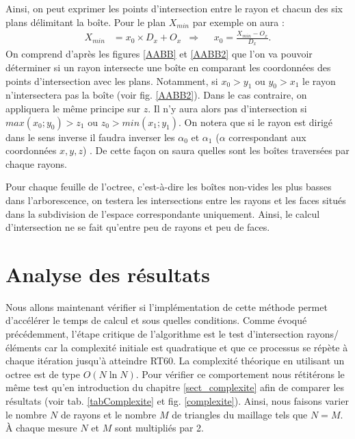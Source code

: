 %
Ainsi, on peut exprimer les points d'intersection entre le rayon et chacun des six plans délimitant la boîte. Pour le plan $X_{min}$ par exemple on aura :
%
\begin{align*}
X_{min} &= x_0 \times D_x + O_x 	& \Rightarrow 	& &	 x_0 = \frac{X_{min} - O_x}{D_x}.
\end{align*}
%
On comprend d'après les figures \ref{AABB} et \ref{AABB2} que l'on va pouvoir déterminer si un rayon intersecte une boîte en comparant les coordonnées des points d'intersection avec les plans. Notamment, si $x_0 > y_1$ ou $y_0 > x_1$ le rayon n'intersectera pas la boîte (voir fig. \ref{AABB2}). Dans le cas contraire, on appliquera le même principe sur $z$. Il n'y aura alors pas d'intersection si $max(x_0 ; y_0) > z_1$ ou $ z_0 > min(x_1 ; y_1)$. On notera que si le rayon est dirigé dans le sens inverse il faudra inverser les $\alpha_0$ et $\alpha_1$ ($\alpha$ correspondant aux coordonnées $x,y,z$) . De cette façon on saura quelles sont les boîtes traversées par chaque rayons. 

Pour chaque feuille de l'\gls{octree}, c'est-à-dire les boîtes non-vides les plus basses dans l'arborescence, on testera les intersections entre les rayons et les faces situés dans la subdivision de l'espace correspondante uniquement. Ainsi, le calcul d'intersection ne se fait qu'entre peu de rayons et peu de faces.



\section{Analyse des résultats} \label{sect_resultatOctree}

Nous allons maintenant vérifier si l'implémentation de cette méthode permet d'accélérer le temps de calcul et sous quelles conditions. Comme évoqué précédemment, l'étape critique de l'algorithme est le test d'intersection rayons/éléments car la complexité initiale est quadratique et que ce processus se répète à chaque itération jusqu'à atteindre \gls{RT60}. La complexité théorique en utilisant un \gls{octree} est de type $O(N\ln{N})$. 
Pour vérifier ce comportement nous rétitérons le même test qu'en introduction du chapitre \ref{sect_complexite} afin de comparer les résultats (voir tab. \ref{tabComplexite} et fig. \ref{complexite}). Ainsi, nous faisons varier le nombre $N$ de rayons et le nombre $M$ de triangles du maillage tels que $N = M$. À chaque mesure $N$ et $M$ sont multipliés par 2.

